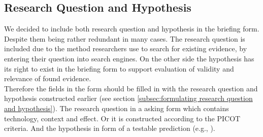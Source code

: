 \subsection{Research Question and Hypothesis}
\label{subsec:research question and hypothesis}

We decided to include both research question and hypothesis in the briefing form. Despite them being rather redundant in many cases. The research question is included due to the method researchers use to search for existing evidence, by entering their question into search engines. On the other side the hypothesis has its right to exist in the briefing form to support evaluation of validity and relevance of found evidence. \\
Therefore the fields in the form should be filled in with the research question and hypothesis constructed earlier (see section \ref{subsec:formulating research question and hypothesis}). The research question in a asking form which contains technology, context and effect. Or it is constructed according to the PICOT criteria. And the hypothesis in form of a testable prediction (e.g.,  \cite{Buddies2010}).